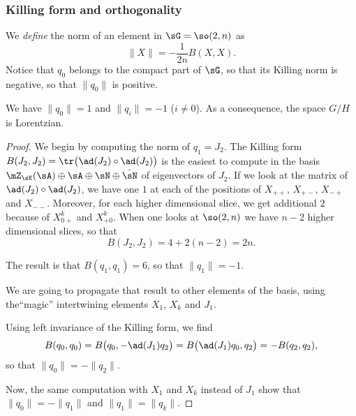 %
\subsubsection{Killing form and orthogonality}
%




We \emph{define} the norm of an element in $\sG=\so(2,n)$ as
\begin{equation}	\label{LONGEqDefNormeKillingSix}
	\| X \|=-\frac{ 1 }{2n}B(X,X).
\end{equation}
Notice that $q_0$ belongs to the compact part of $\sG$, so that its Killing norm is negative, so that $\| q_0 \|$ is positive.


\begin{proposition}		\label{LONGPropBaseQOrtho}
	We have $\| q_0 \|=1$ and $\| q_i \|=-1$ ($i\neq 0$). As a consequence, the space $G/H$ is Lorentzian.
\end{proposition}


\begin{proof}
	We begin by computing the norm of $q_1=J_2$. The Killing form $B(J_2,J_2)=\tr\big( \ad(J_2)\circ\ad(J_2) \big)$ is the easiest to compute in the basis $\mZ_{\sK}(\sA)\oplus\sA\oplus\sN\oplus\bar\sN$ of eigenvectors of $J_2$. If we look at the matrix of $\ad(J_2)\circ\ad(J_2)$, we have one $1$ at each of the positions of $X_{++}$, $X_{+-}$, $X_{-+}$ and $X_{--}$. Moreover, for each higher dimensional slice, we get additional $2$ because of $X_{0+}^k$ and $X_{+0}^k$. When one looks at $\so(2,n)$ we have $n-2$ higher dimensional slices, so that
	\begin{equation}
		B(J_2,J_2)=4+2(n-2)=2n.
	\end{equation}

	The result is that $B(q_1,q_1)=6$, so that $\| q_1 \|=-1$.

	We are going to propagate that result to other elements of the basis, using the``magic'' intertwining elements $X_1$, $X_k$ and $J_1$.

	Using left invariance of the Killing form, we find
	\begin{equation}		\label{LONGEqCalculBBBqZeroqUnNirme}
		B(q_0,q_0)=B\big( q_0,-\ad(J_1)q_2 \big)=B\big( \ad(J_1)q_0,q_2 \big)=-B(q_2,q_2),
	\end{equation}
	so that $\| q_0 \| =-\| q_2 \|$.

	Now, the same computation with $X_1$ and $X_k$ instead of $J_1$ show that $\| q_0 \|=-\| q_1 \|$ and $\| q_1 \|=\| q_k \|$.
\end{proof}



